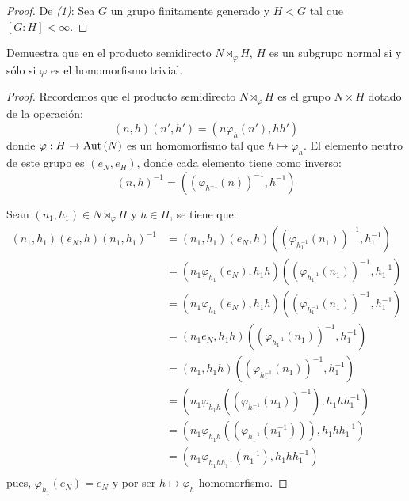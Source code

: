 \documentclass[12pt]{report}
\newcounter{it}
\theoremstyle{largebreak}
\newcommand\cf[3]{\ensuremath{#1:#2\rightarrow#3}}
\newcommand\Aut[1]{\ensuremath{\textup{Aut}\left(#1\right)}}
\begin{document}
    \begin{proof}
        De \textit{(1)}: Sea $G$ un grupo finitamente generado y $H<G$ tal que $[G:H]<\infty$.


    \end{proof}

    \begin{excer}
        Demuestra que en el producto semidirecto $N\rtimes_{\varphi}H$, $H$ es un subgrupo normal si y sólo si $\varphi$ es el homomorfismo trivial.
    \end{excer}

    \begin{proof}
        Recordemos que el producto semidirecto $N\rtimes_\varphi H$ es el grupo $N\times H$ dotado de la operación:
        \begin{equation*}
            (n,h)(n',h')=(n\varphi_h(n'),hh')
        \end{equation*}
        donde $\cf{\varphi}{H}{\Aut{N}}$ es un homomorfismo tal que $h\mapsto\varphi_h$. El elemento neutro de este grupo es $(e_N,e_H)$, donde cada elemento tiene como inverso:
        \begin{equation*}
            (n,h)^{-1}=\left((\varphi_{h^{-1}}(n))^{-1},h^{-1}\right)
        \end{equation*}

        Sean $(n_1,h_1)\in N\rtimes_{\varphi}H$ y $h\in H$, se tiene que:
        \begin{equation*}
            \begin{split}
                (n_1,h_1)(e_N,h)(n_1,h_1)^{-1}&=(n_1,h_1)(e_N,h)\left((\varphi_{h_1^{-1}}(n_1))^{-1},h_1^{-1}\right)\\
                &=(n_1\varphi_{h_1}(e_N),h_1h)\left((\varphi_{h_1^{-1}}(n_1))^{-1},h_1^{-1}\right)\\
                &=(n_1\varphi_{h_1}(e_N),h_1h)\left((\varphi_{h_1^{-1}}(n_1))^{-1},h_1^{-1}\right)\\
                &=(n_1e_N,h_1h)\left((\varphi_{h_1^{-1}}(n_1))^{-1},h_1^{-1}\right)\\
                &=(n_1,h_1h)\left((\varphi_{h_1^{-1}}(n_1))^{-1},h_1^{-1}\right)\\
                &=\left(n_1\varphi_{h_1h}\left((\varphi_{h_1^{-1}}(n_1))^{-1}\right),h_1hh_1^{-1} \right)\\
                &=\left(n_1\varphi_{h_1h}\left((\varphi_{h_1^{-1}}(n_1^{-1}))\right),h_1hh_1^{-1} \right)\\
                &=\left(n_1\varphi_{h_1h h_1^{-1}}\left(n_1^{-1}\right),h_1hh_1^{-1} \right)\\
            \end{split}
        \end{equation*}
        pues, $\varphi_{h_1}(e_N)=e_N$ y por ser $h\mapsto\varphi_h$ homomorfismo.


\end{proof}
\end{document}
